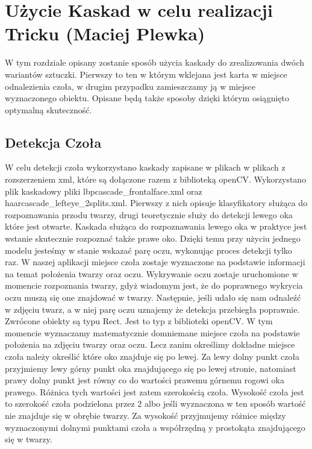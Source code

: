 \section{Użycie Kaskad w celu realizacji Tricku (Maciej Plewka)}

W tym rozdziale opisany zostanie sposób użycia kaskady do zrealizowania dwóch wariantów sztuczki. Pierwszy to ten w którym wklejana jest karta w miejsce odnalezienia czoła, w drugim przypadku zamieszczamy ją w miejsce wyznaczonego obiektu. Opisane będą także sposoby dzięki którym osiągnięto optymalną skuteczność.

\subsection{Detekcja Czoła}

W celu detekcji czoła wykorzystano kaskady zapisane w plikach w plikach z rozszerzeniem xml, które są dołączone razem z biblioteką openCV. Wykorzystano plik kaskadowy pliki lbpcascade\_frontalface.xml oraz haarcascade\_lefteye\_2splits.xml.
Pierwszy z nich opisuje klasyfikatory służąca do rozpoznawania przodu twarzy, drugi 
teoretycznie służy do detekcji lewego oka które jest otwarte. Kaskada służąca do rozpoznawania lewego oka w praktyce jest wstanie skutecznie rozpoznać także prawe oko. Dzięki temu przy użyciu jednego modelu jesteśmy w stanie wskazać parę oczu, wykonując proces detekcji tylko raz. W naszej aplikacji miejsce czoła zostaje wyznaczone na podstawie informacji na temat położenia twarzy oraz oczu. Wykrywanie oczu zostaje uruchomione w momencie rozpoznania twarzy, gdyż wiadomym jest, że do poprawnego wykrycia oczu muszą się one znajdować w twarzy. 
Następnie, jeśli udało się nam odnaleźć w zdjęciu twarz, a w niej parę oczu uznajemy że detekcja przebiegła poprawnie. Zwrócone obiekty są typu Rect. Jest to typ z biblioteki openCV. W tym momencie wyznaczamy matematycznie domniemane miejsce czoła na podstawie położenia na zdjęciu twarzy oraz oczu. Lecz zanim określimy dokładne miejsce czoła należy określić które oko znajduje się po lewej.
Za lewy dolny punkt czoła przyjmiemy lewy górny punkt oka znajdującego się po lewej stronie, natomiast prawy dolny punkt jest równy co do wartości prawemu górnemu rogowi oka prawego. Różnica tych wartości jest zatem szerokością czoła. Wysokość czoła jest to szerokość czoła podzielona przez 2 albo jeśli wyznaczona w ten sposób wartość nie znajduje się w obrębie twarzy. Za wysokość przyjmujemy różnice między wyznaczonymi dolnymi punktami czoła a współrzędną y prostokąta znajdującego się w twarzy.


